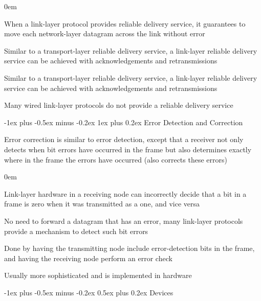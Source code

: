 \documentclass[letterpaper,8pt]{extarticle}
\makeatletter
\renewcommand{\subsection}{\@startsection{subsection}{2}{0mm}%
  {-1ex plus -0.5ex minus -0.2ex}%
  {0.5ex plus 0.2ex}%
{\color{h2}\normalfont\fontsize{6}{6}\selectfont\bfseries}}
\renewcommand{\subsubsection}{\@startsection{subsubsection}{3}{0mm}%
  {-1ex plus -0.5ex minus -0.2ex}%
  {1ex plus 0.2ex}%
{\color{h3} \normalfont\fontsize{5.5}{5.5}\selectfont\bfseries\itshape}}
\let\olditemize\itemize \let\endolditemize\enditemize
\renewenvironment{itemize}{\olditemize \itemsep0em}{\endolditemize}
\makeatother
\begin{document}
\begin{multicols*}{5}
  \begin{itemize}
    \item When a link-layer protocol provides reliable delivery service, it guarantees to move each network-layer datagram across the link without error
    \item Similar to a transport-layer reliable delivery service, a link-layer reliable delivery service can be achieved with acknowledgements and retransmissions
    \item Similar to a transport-layer reliable delivery service, a link-layer reliable delivery service can be achieved with acknowledgements and retransmissions
    \item Many wired link-layer protocols do not provide a reliable delivery service
  \end{itemize}

  \subsubsection{Error Detection and Correction}

  Error correction is similar to error detection, except that a receiver not only detects when bit errors have occurred in the frame but also determines exactly where in the frame the errors have occurred (also corrects these errors)

  \begin{itemize}
    \item Link-layer hardware in a receiving node can incorrectly decide that a bit in a frame is zero when it was transmitted as a one, and vice versa
    \item No need to forward a datagram that has an error, many link-layer protocols provide a mechanism to detect such bit errors
    \item Done by having the transmitting node include error-detection bits in the frame, and having the receiving node perform an error check
    \item Usually more sophisticated and is implemented in hardware
  \end{itemize}

  \subsection{Devices}


\end{multicols*}
\end{document}
